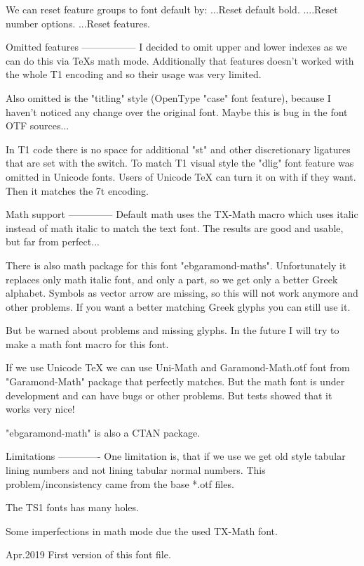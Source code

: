 We can reset feature groups to font default by:
\resetbold...Reset default bold.
\resetnum....Reset number options.
\resetfeat...Reset features.

 Omitted features
-----------------
I decided to omit upper and lower indexes as we can do this
via TeXs math mode. Additionally that features doesn't worked
with the whole T1 encoding and so their usage was very limited.

Also omitted is the "titling" style (OpenType "case" font feature),
because I haven't noticed any change over the original font.
Maybe this is bug in the font OTF sources...

In T1 code there is no space for additional "st" and other
discretionary ligatures that are set with the \swash switch.
To match T1 visual style the "dlig" font feature was omitted
in Unicode fonts. Users of Unicode TeX can turn it on with
 if they want. Then it matches the 7t encoding.

 Math support
--------------
Default math uses the TX-Math macro which uses italic
instead of math italic to match the text font. The results
are good and usable, but far from perfect...

There is also math package for this font "ebgaramond-maths".
Unfortunately it replaces only math italic font, and only a part,
so we get only a better Greek alphabet. Symbols as vector arrow
are missing, so this will not work anymore and other problems.
If you want a better matching Greek glyphs you can still use it.

   

But be warned about problems and missing glyphs.
In the future I will try to make a math font macro for this font.

If we use Unicode TeX we can use Uni-Math and Garamond-Math.otf font
from "Garamond-Math" package that perfectly matches. But the math font
is under development and can have bugs or other problems.
   But tests showed that it works very nice!

   \let\loadmathfonts=\relax
   
   \def\unimathfont{[Garamond-Math]}
   

"ebgaramond-math" is also a CTAN package.

 Limitations
-------------
One limitation is, that if we use \tabn\linn\caps
we get old style tabular lining numbers and not lining tabular normal numbers.
This problem/inconsistency came from the base *.otf files.

The TS1 fonts has many holes.

Some imperfections in math mode due the used TX-Math font.



Apr.2019  First version of this font file.


